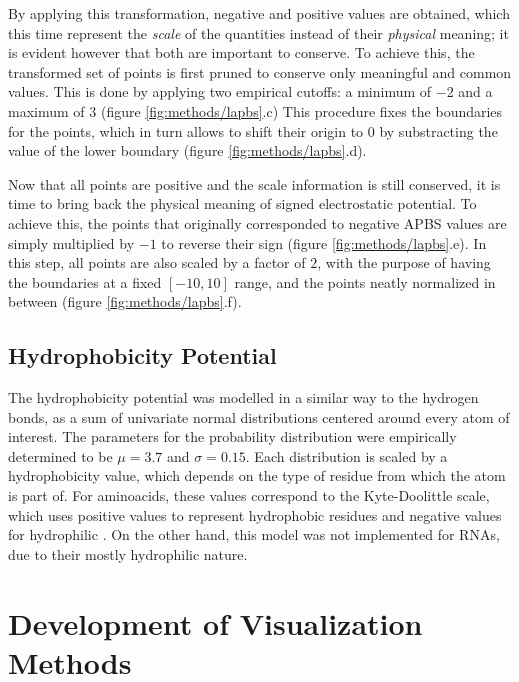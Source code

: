     By applying this transformation, negative and positive values are obtained, which this time represent the \textit{scale} of the quantities instead of their \textit{physical} meaning; it is evident however that both are important to conserve. To achieve this, the transformed set of points is first pruned to conserve only meaningful and common values. This is done by applying two empirical cutoffs: a minimum of $-2$ and a maximum of $3$ (figure \ref{fig:methods/lapbs}.c) This procedure fixes the boundaries for the points, which in turn allows to shift their origin to 0 by substracting the value of the lower boundary (figure \ref{fig:methods/lapbs}.d).

    Now that all points are positive and the scale information is still conserved, it is time to bring back the physical meaning of signed electrostatic potential. To achieve this, the points that originally corresponded to negative APBS values are simply multiplied by $-1$ to reverse their sign (figure \ref{fig:methods/lapbs}.e). In this step, all points are also scaled by a factor of $2$, with the purpose of having the boundaries at a fixed $[-10, 10]$ range, and the points neatly normalized in between (figure \ref{fig:methods/lapbs}.f).

  \subsection{Hydrophobicity Potential}
    The hydrophobicity potential was modelled in a similar way to the hydrogen bonds, as a sum of univariate normal distributions centered around every atom of interest. The parameters for the probability distribution were empirically determined to be $\mu = 3.7$ and $\sigma = 0.15$. Each distribution is scaled by a hydrophobicity value, which depends on the type of residue from which the atom is part of. For aminoacids, these values correspond to the Kyte-Doolittle scale, which uses positive values to represent hydrophobic residues and negative values for hydrophilic \cite{hydrophobic_scale_1982}. On the other hand, this model was not implemented for RNAs, due to their mostly hydrophilic nature.


\section{Development of Visualization Methods}
